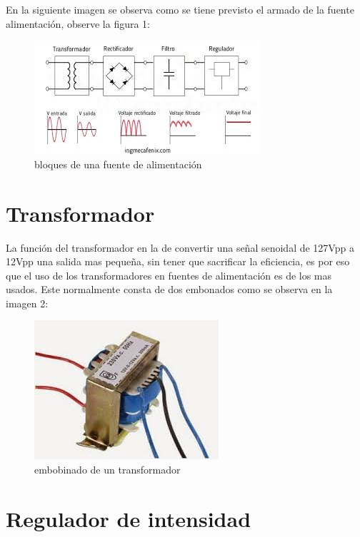 \documentclass[12pt,a4paper]{article}
\begin{document}
En la siguiente imagen se observa como se tiene previsto el armado de la fuente alimentación, observe la figura 1:

\begin{figure}
\begin{center}
\includegraphics[scale=1]{imagenes/2.jpeg}
\caption{bloques de una fuente de alimentación}
\end{center}
\end{figure}


\section{Transformador}

La función del transformador en la de convertir una señal senoidal de 127Vpp a 12Vpp una salida mas pequeña, sin tener que sacrificar la eficiencia, es por eso que el uso de los transformadores en fuentes de alimentación es de los mas usados. Este normalmente consta de dos embonados como se observa en la imagen 2:

\begin{figure}[h]
\begin{center}
\includegraphics[scale=0.5]{imagenes/3.jpeg}
\caption{embobinado de un transformador}
\end{center}
\end{figure}


\section{Regulador de intensidad}
\end{document}
